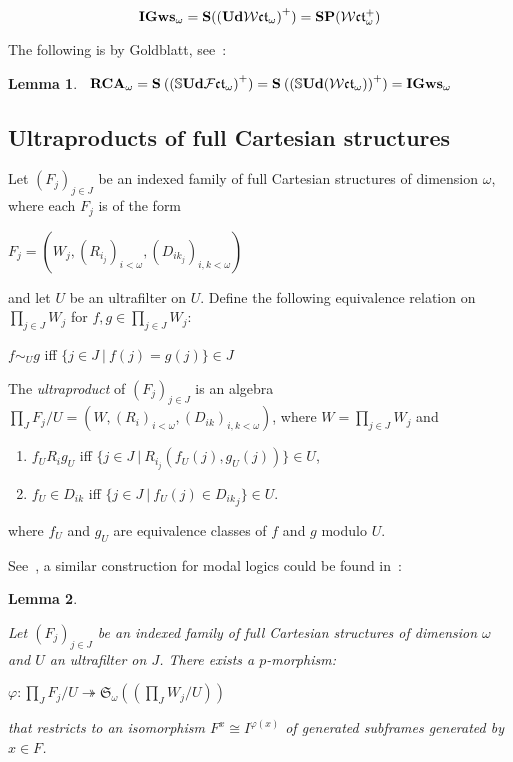 \documentclass{article}
\theoremstyle{defin}
\theoremstyle{theorem}
\theoremstyle{claim}
\theoremstyle{prop}
\theoremstyle{lemma}
\newtheorem{lemma}{Lemma}
\theoremstyle{fact}
\theoremstyle{remark}
\theoremstyle{ex}
\theoremstyle{col}
\theoremstyle{question}
\begin{document}
\begin{equation}
{\bf IGws}_{\omega} = {\bf S} ({({\bf Ud} \mathcal{W}\mathfrak{ct}_{\omega})}^+) = {\bf S P} (\mathcal{W}\mathfrak{ct}_{\omega}^{+})
\end{equation}

The following is by Goldblatt, see~\cite[Lemma 3.4]{goldblatt1995elementary}:
\begin{lemma}~\label{rcadef}
${\bf RCA}_{\omega} = {\bf S} \: ({(\mathbb{S} {\bf Ud} \mathcal{F}\mathfrak{ct}_{\omega})}^{+}) = {\bf S} \: ({(\mathbb{S} {\bf Ud} (\mathcal{W}\mathfrak{ct}_{\omega}))}^{+}) = {\bf IGws}_{\omega}$
\end{lemma}

\subsection{Ultraproducts of full Cartesian structures}

Let ${(F_j)}_{j \in J}$ be an indexed family of full Cartesian structures of dimension $\omega$, 
where each $F_j$ is of the form 
\begin{center}
$F_j = (W_j, {(R_{i_j})}_{i < \omega}, {(D_{{ik}_j})}_{i, k < \omega})$
\end{center}
and let $U$ be an ultrafilter on $U$. 
Define the following equivalence relation on 
$\prod \limits_{j \in J} W_j$ for $f, g \in \prod \limits_{j \in J} W_j$:
\begin{center}
$f \sim_{U} g$ iff $\{ j \in J \: | \: f(j) = g(j) \} \in J$
\end{center}
The \emph{ultraproduct} of ${(F_j)}_{j \in J}$ is an algebra 
$\prod \limits_{J} F_j / U = (W, {(R_i)}_{i < \omega}, {(D_{ik})}_{i, k < \omega})$, 
where $W = \prod \limits_{j \in J} W_j$ and
\begin{enumerate}
\item $f_U R_i g_U$ iff $\{ j \in J \: | \: R_{i_j}(f_U(j), g_U(j)) \} \in U$,
\item $f_U \in D_{ik}$ iff $\{ j \in J \: | \: f_U(j) \in {D_{ik}}_j \} \in U$.
\end{enumerate}
where $f_U$ and $g_U$ are equivalence classes of $f$ and $g$ modulo $U$.

See~\cite[Lemma 3.5]{goldblatt1995elementary}, 
a similar construction for modal logics could be found in~\cite{fine1975some}:
\begin{lemma}~\label{ultrapmor}

Let ${(F_j)}_{j \in J}$ be an indexed family of full Cartesian structures of dimension 
$\omega$ and $U$ an ultrafilter on $J$. There exists a $p$-morphism:

\begin{center}
$\varphi : \prod \limits_{J} F_j / U \twoheadrightarrow \mathfrak{S}_{\omega}((\prod \limits_{J} W_j / U))$
\end{center}
that restricts to an isomorphism $F^x \cong I^{\varphi(x)}$ of generated subframes generated by $x \in F$.
\end{lemma}
\end{document}
